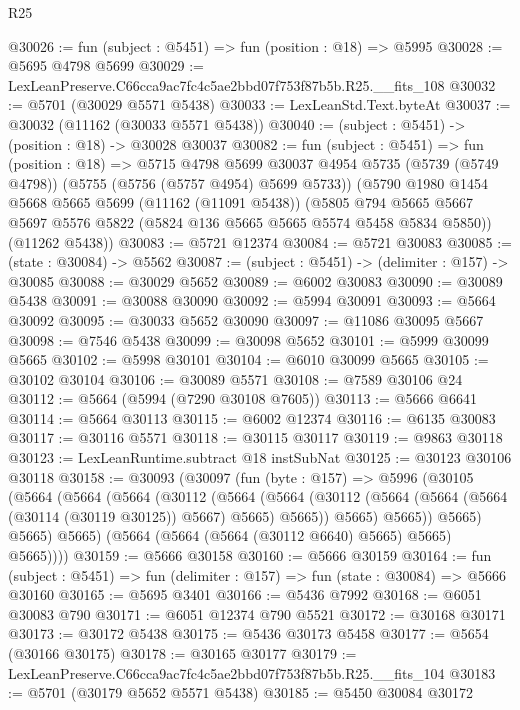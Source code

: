 \begin{lexlean}{R25}
\begin{coremodule}
@30026 := fun (subject : @5451) => fun (position : @18) => @5995
@30028 := @5695 @4798 @5699
@30029 := LexLeanPreserve.C66cca9ac7fc4c5ae2bbd07f753f87b5b.R25.__fits_108
@30032 := @5701 (@30029 @5571 @5438)
@30033 := LexLeanStd.Text.byteAt
@30037 := @30032 (@11162 (@30033 @5571 @5438))
@30040 := (subject : @5451) -> (position : @18) -> @30028 @30037
@30082 := fun (subject : @5451) =>
  fun (position : @18) =>
  @5715
    @4798
    @5699
    @30037
    @4954
    @5735
    (@5739 (@5749 @4798))
    (@5755 (@5756 (@5757 @4954) @5699 @5733))
    (@5790
      @1980
      @1454
      @5668
      @5665
      @5699
      (@11162 (@11091 @5438))
      (@5805 @794 @5665 @5667 @5697 @5576 @5822 (@5824 @136 @5665 @5665 @5574 @5458 @5834 @5850))
      (@11262 @5438))
@30083 := @5721 @12374
@30084 := @5721 @30083
@30085 := (state : @30084) -> @5562
@30087 := (subject : @5451) -> (delimiter : @157) -> @30085
@30088 := @30029 @5652
@30089 := @6002 @30083
@30090 := @30089 @5438
@30091 := @30088 @30090
@30092 := @5994 @30091
@30093 := @5664 @30092
@30095 := @30033 @5652 @30090
@30097 := @11086 @30095 @5667
@30098 := @7546 @5438
@30099 := @30098 @5652
@30101 := @5999 @30099 @5665
@30102 := @5998 @30101
@30104 := @6010 @30099 @5665
@30105 := @30102 @30104
@30106 := @30089 @5571
@30108 := @7589 @30106 @24
@30112 := @5664 (@5994 (@7290 @30108 @7605))
@30113 := @5666 @6641
@30114 := @5664 @30113
@30115 := @6002 @12374
@30116 := @6135 @30083
@30117 := @30116 @5571
@30118 := @30115 @30117
@30119 := @9863 @30118
@30123 := LexLeanRuntime.subtract @18 instSubNat
@30125 := @30123 @30106 @30118
@30158 := @30093
    (@30097
      (fun (byte : @157) =>
      @5996
        (@30105
          (@5664
            (@5664
              (@5664
                (@30112
                  (@5664
                    (@5664
                      (@30112 (@5664 (@5664 (@5664 (@30114 (@30119 @30125)) @5667) @5665) @5665))
                      @5665)
                    @5665))
                @5665)
              @5665)
            @5665)
          (@5664 (@5664 (@5664 (@30112 @6640) @5665) @5665) @5665))))
@30159 := @5666 @30158
@30160 := @5666 @30159
@30164 := fun (subject : @5451) => fun (delimiter : @157) => fun (state : @30084) => @5666 @30160
@30165 := @5695 @3401
@30166 := @5436 @7992
@30168 := @6051 @30083 @790
@30171 := @6051 @12374 @790 @5521
@30172 := @30168 @30171
@30173 := @30172 @5438
@30175 := @5436 @30173 @5458
@30177 := @5654 (@30166 @30175)
@30178 := @30165 @30177
@30179 := LexLeanPreserve.C66cca9ac7fc4c5ae2bbd07f753f87b5b.R25.__fits_104
@30183 := @5701 (@30179 @5652 @5571 @5438)
@30185 := @5450 @30084 @30172

\end{coremodule}
\end{lexlean}
